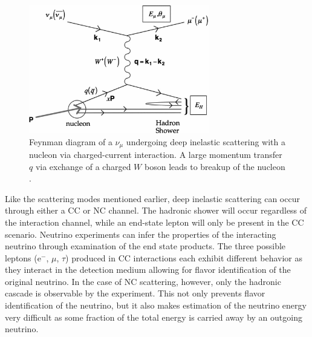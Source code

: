 \documentclass{gatech-thesis}
\begin{document}
\begin{figure}[ht]
  \begin{center}
    \includegraphics[width=0.7\textwidth,keepaspectratio]{dis.png}
  \end{center}
  \caption[Deep Inelastic Scattering Feynman Diagram]{Feynman diagram of a $\nu_{\mu}$ undergoing deep inelastic scattering with a nucleon via charged-current interaction. A large momentum transfer $q$ via exchange of a charged $W$ boson leads to breakup of the nucleon \cite{2012RvMP...84.1307F}.}
  \label{fig:dis_scattering}
\end{figure}

Like the scattering modes mentioned earlier, deep inelastic scattering can occur through either a CC or NC channel. The hadronic shower will occur regardless of the interaction channel, while an end-state lepton will only be present in the CC scenario. Neutrino experiments can infer the properties of the interacting neutrino through examination of the end state products. The three possible leptons (e$^-$, $\mu$, $\tau$) produced in CC interactions each exhibit different behavior as they interact in the detection medium allowing for flavor identification of the original neutrino. In the case of NC scattering, however, only the hadronic cascade is observable by the experiment. This not only prevents flavor identification of the neutrino, but it also makes estimation of the neutrino energy very difficult as some fraction of the total energy is carried away by an outgoing neutrino.
\end{document}
